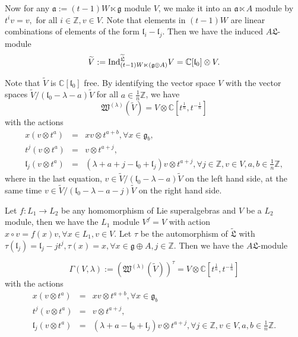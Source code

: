 \documentclass[1p]{elsarticle}
\numberwithin{equation}{section}
\def\fg{\mathfrak{g}}
\def\fL{\mathfrak{L}}
\def\ca{\mathfrak{a}}
\def\bC{\mathbb{C}}
\def\bZ{\mathbb{Z}}
\def\Ind{{\rm Ind}}
\def\tL{\widetilde{\fL}}
\def\fl{\mathfrak{l}}
\begin{document}
Now for any $\ca:=(t-1)W\ltimes \fg$ module $V$, we make it into an $\ca\ltimes A$ module by $t^i v=v,$ for all $i\in \bZ, v\in V$. Note that elements in $(t-1)W$ are linear combinations of  elements of the form $\fl_i-\fl_j$. Then we have the induced $A\fL$-module
$$\widetilde{V}:=\Ind_{(t-1)W\ltimes (\fg\oplus A)}^{\tL} V=\bC[\fl_0]\otimes V.$$

Note that $\tilde{V}$ is $\bC[\fl_0]$ free.  By identifying the vector space $V$ with  the vector spaces $\widetilde{V}/(\fl_0-\lambda-a)\widetilde{V}$ for all $a\in \frac 1n \bZ$, we have $$\mathfrak{W}^{(\lambda)}(\widetilde{V})=V\otimes \bC[t^{\frac 1n},t^{-\frac 1n}]$$ with the actions
\begin{eqnarray*}x (v\otimes t^{a}) &=& xv\otimes t^{a+b},\forall x\in \fg_{b}, \\
t^j (v\otimes t^{a}) &=& v\otimes t^{a+j},\\
\fl_j (v\otimes t^{a}) &=&(\lambda+a+j-\fl_0+\fl_j)v\otimes t^{a+j},\forall j\in \bZ,v\in V,a,b\in \frac 1n \bZ,
\end{eqnarray*}
where in the last equation, $v\in \widetilde{V}/(\fl_0-\lambda-a)\widetilde{V}$ on the left hand side, at the same time  $v\in \widetilde{V}/(\fl_0-\lambda-a-j)\widetilde{V}$ on the right hand side.

Let $f:L_1\rightarrow L_2$ be any homomorphism of Lie superalgebras and $V$ be a $L_2$ module, then we have the $L_1$ module $V^{f}=V$  with action $x\circ v=f(x) v,\forall x\in L_1,v\in V$. Let $\tau$ be the automorphism of $\tL$ with $\tau(\fl_j)=\fl_j-jt^j,\tau(x)=x,\forall x\in \fg\oplus A, j\in \bZ$. Then we have the $A\fL$-module

$$\Gamma(V, \lambda):=(\mathfrak{W}^{(\lambda)}(\widetilde{V}))^\tau=V\otimes \bC[t^{\frac 1n},t^{-\frac 1n}]$$ with the actions
\begin{eqnarray}\label{weighted-1}x (v\otimes t^{a}) &=& xv\otimes t^{a+b},\forall x\in \fg_b \\
\label{weighted-2}  t^j (v\otimes t^{a}) &=& v\otimes t^{a+j},\\
\label{weighted-3}  \fl_j (v\otimes t^{a}) &=&(\lambda+a-\fl_0+\fl_j)v\otimes t^{a+j},\forall j\in \bZ,v\in V,a,b\in \frac 1n \bZ.
\end{eqnarray}
\end{document}
